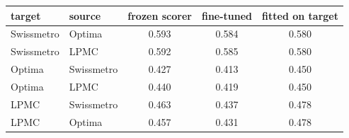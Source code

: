 \begin{tabular}{llccc}
\toprule
target & source & frozen scorer & fine-tuned & fitted on target \\
\midrule
Swissmetro & Optima & 0.593 & 0.584 & 0.580 \\
Swissmetro & LPMC & 0.592 & 0.585 & 0.580 \\
Optima & Swissmetro & 0.427 & 0.413 & 0.450 \\
Optima & LPMC & 0.440 & 0.419 & 0.450 \\
LPMC & Swissmetro & 0.463 & 0.437 & 0.478 \\
LPMC & Optima & 0.457 & 0.431 & 0.478 \\
\bottomrule
\end{tabular}